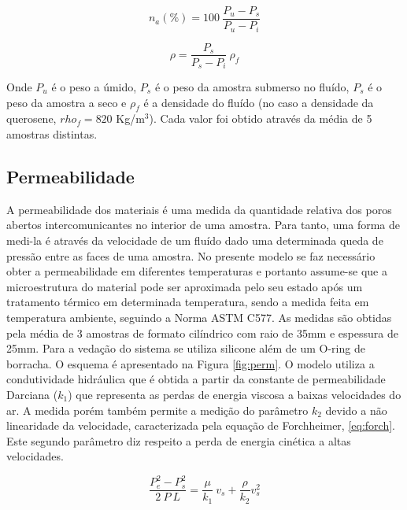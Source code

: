     \begin{equation}
      \label{eq:PA}
      n_a (\%)= 100 \ \frac{P_u-P_s}{P_u-P_i}
    \end{equation}

    \begin{equation}
      \label{eq:DA}
      \rho = \frac{P_s}{P_s - P_i} \ \rho_f
    \end{equation}

    Onde $P_u$ é o peso a úmido, $P_s$ é o peso da amostra submerso no fluído,
    $P_s$ é o peso da amostra a seco e $\rho_f$ é a densidade do fluído (no
    caso a densidade da querosene, $rho_f = 820$ Kg/m$^3$). Cada valor foi obtido
    através da média de 5 amostras distintas.
    
    \subsection{Permeabilidade}\label{mat:perm}

    A permeabilidade dos materiais é uma medida da quantidade relativa dos poros
    abertos intercomunicantes no interior de uma amostra. Para tanto, uma forma
    de medi-la é através da velocidade de um fluído dado uma determinada queda
    de pressão entre as faces de uma amostra. No presente modelo se faz
    necessário obter a permeabilidade em diferentes temperaturas e portanto
    assume-se que a microestrutura do material pode ser aproximada pelo seu
    estado após um tratamento térmico em determinada temperatura, sendo a medida
    feita em temperatura ambiente, seguindo a Norma ASTM C577. As medidas são
    obtidas pela média de 3 amostras de formato cilíndrico com raio de 35mm e
    espessura de 25mm. Para a vedação do sistema se utiliza silicone além de um
    O-ring de borracha. O esquema é apresentado na Figura \ref{fig:perm}. O
    modelo utiliza a condutividade hidráulica que é obtida a partir da constante
    de permeabilidade Darciana ($k_1$) que representa as perdas de energia
    viscosa a baixas velocidades do ar. A medida porém também permite a medição do
    parâmetro $k_2$ devido a não linearidade da velocidade, caracterizada pela
    equação de Forchheimer, \ref{eq:forch}. Este segundo parâmetro diz respeito
    a perda de energia cinética a altas velocidades.

    \begin{equation}
      \label{eq:forch}
      \frac{P_e^2 - P_s^2}{2 \ P \ L} = \frac{\mu}{k_1} \ v_s + \frac{\rho}{k_2}v_s^2
    \end{equation}

